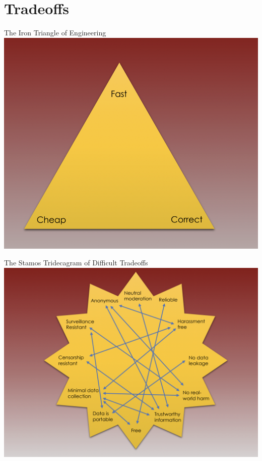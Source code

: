 \documentclass[nobackground,dvipsnames,table,aspectratio=169]{beamer}
\begin{document}
\section{Tradeoffs}

\begin{frame}{The Iron Triangle of Engineering}
    \centering
    \includegraphics[height=0.9\textheight]{iron-triangle}
\end{frame}

\begin{frame}{The Stamos Tridecagram of Difficult Tradeoffs}
    \centering
    \includegraphics[width=\textwidth]{tridecagram.png}
\end{frame}
\end{document}
